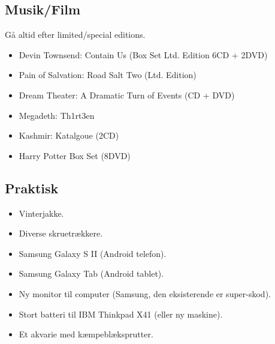 \documentclass[a4paper, danish, 10pt, final]{article}
\begin{document}
\subsection*{Musik/Film}

Gå altid efter limited/special editions.
\begin{itemize}
    \item Devin Townsend: Contain Us (Box Set Ltd. Edition 6CD + 2DVD)
    \item Pain of Salvation: Road Salt Two (Ltd. Edition)
    \item Dream Theater: A Dramatic Turn of Events (CD + DVD)
    \item Megadeth: Th1rt3en
    \item Kashmir: Katalgoue (2CD)
    \item Harry Potter Box Set (8DVD)
\end{itemize}

\subsection*{Praktisk}
\begin{itemize}
    \item Vinterjakke.
    \item Diverse skruetrækkere.
    \item Samsung Galaxy S II (Android telefon).
    \item Samsung Galaxy Tab (Android tablet).
    \item Ny monitor til computer (Samsung, den eksisterende er super-skod).
    \item Stort batteri til IBM Thinkpad X41 (eller ny maskine).
    \item Et akvarie med kæmpeblæksprutter.
\end{itemize}




\end{document}

